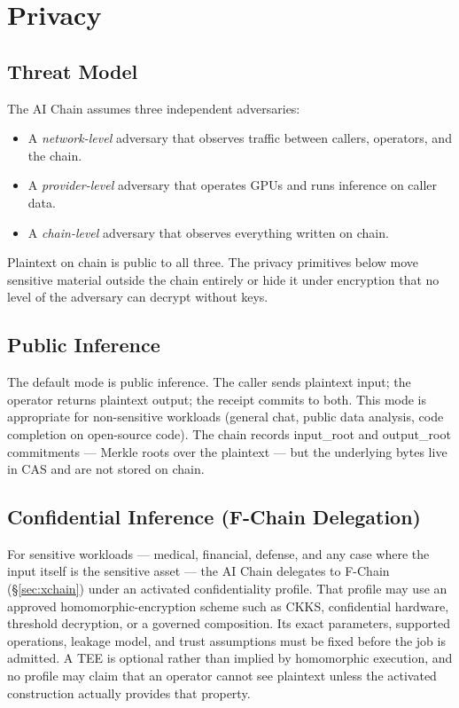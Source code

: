 \section{Privacy}
\label{sec:privacy}

\subsection{Threat Model}

The AI Chain assumes three independent adversaries:

\begin{itemize}[leftmargin=1.2em]
  \item A \emph{network-level} adversary that observes traffic between
        callers, operators, and the chain.
  \item A \emph{provider-level} adversary that operates GPUs and runs
        inference on caller data.
  \item A \emph{chain-level} adversary that observes everything written
        on chain.
\end{itemize}

Plaintext on chain is public to all three. The privacy primitives below
move sensitive material outside the chain entirely or hide it under
encryption that no level of the adversary can decrypt without keys.

\subsection{Public Inference}

The default mode is public inference. The caller sends plaintext input;
the operator returns plaintext output; the receipt commits to both. This
mode is appropriate for non-sensitive workloads (general chat, public
data analysis, code completion on open-source code). The chain records
input\_root and output\_root commitments — Merkle roots over the
plaintext — but the underlying bytes live in CAS and are not stored on
chain.

\subsection{Confidential Inference (F-Chain Delegation)}

For sensitive workloads — medical, financial, defense, and any case
where the input itself is the sensitive asset — the AI Chain delegates
to F-Chain (\S\ref{sec:xchain}) under an activated confidentiality profile.
That profile may use an approved homomorphic-encryption scheme such as CKKS,
confidential hardware, threshold decryption, or a governed composition. Its
exact parameters, supported operations, leakage model, and trust assumptions
must be fixed before the job is admitted. A TEE is optional rather than implied
by homomorphic execution, and no profile may claim that an operator cannot see
plaintext unless the activated construction actually provides that property.

